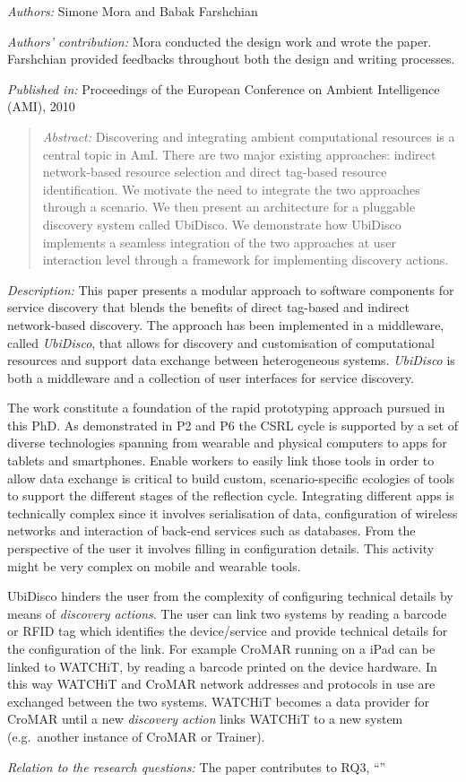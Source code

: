 \emph{Authors:} Simone Mora and Babak Farshchian

\emph{Authors' contribution:} Mora conducted the design work and wrote the paper. Farshchian provided feedbacks throughout both the design and writing processes.

\emph{Published in:} Proceedings of the European Conference on Ambient Intelligence (AMI), 2010 
\begin{quote}
	\emph{Abstract:} Discovering and integrating ambient computational resources is a central topic in AmI. There are two major existing approaches: indirect network-based resource selection and direct tag-based resource identification. We motivate the need to integrate the two approaches through a scenario. We then present an architecture for a pluggable discovery system called UbiDisco. We demonstrate how UbiDisco implements a seamless integration of the two approaches at user interaction level through a framework for implementing discovery actions. 
\end{quote}

\emph{Description:} This paper presents a modular approach to software components for service discovery that blends the benefits of direct tag-based and indirect network-based discovery. The approach has been implemented in a middleware, called \emph{UbiDisco}, that allows for discovery and customisation of computational resources and support data exchange between heterogeneous systems. \emph{UbiDisco} is both a middleware and a collection of user interfaces for service discovery.

The work constitute a foundation of the rapid prototyping approach pursued in this PhD. As demonstrated in P2 and P6 the CSRL cycle is supported by a set of diverse technologies spanning from wearable and physical computers to apps for tablets and smartphones. Enable workers to easily link those tools in order to allow data exchange is critical to build custom, scenario-specific ecologies of tools to support the different stages of the reflection cycle. Integrating different apps is technically complex since it involves serialisation of data, configuration of wireless networks and interaction of back-end services such as databases. From the perspective of the user it involves filling in configuration details. This activity might be very complex on mobile and wearable tools.

UbiDisco hinders the user from the complexity of configuring technical details by means of \emph{discovery actions}. The user can link two systems by reading a barcode or RFID tag which identifies the device/service and provide technical details for the configuration of the link. For example CroMAR running on a iPad can be linked to WATCHiT, by reading a barcode printed on the device hardware. In this way WATCHiT and CroMAR network addresses and protocols in use are exchanged between the two systems. WATCHiT becomes a data provider for CroMAR until a new \emph{discovery action} links WATCHiT to a new system (e.g.~another instance of CroMAR or Trainer).

\emph{Relation to the research questions: } The paper contributes to RQ3, ``\RQiii'' 
